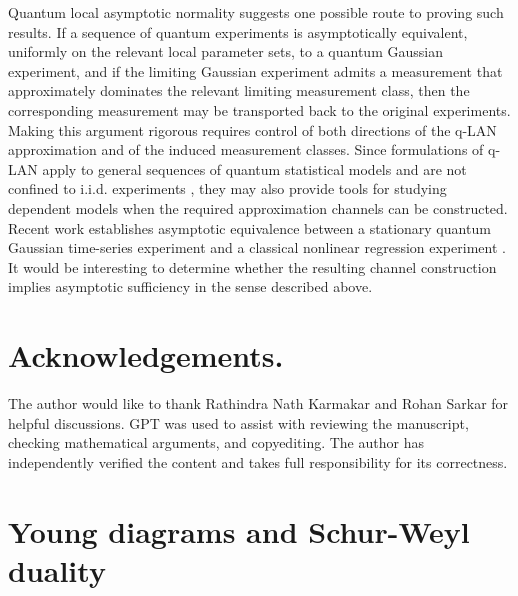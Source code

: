 \documentclass{article}
\theoremstyle{named}
\theoremstyle{named1}
\theoremstyle{plain}
\theoremstyle{remark}
\begin{document}
Quantum local asymptotic normality suggests one possible route to proving
such results. If a sequence of quantum experiments is asymptotically
equivalent, uniformly on the relevant local parameter sets, to a quantum
Gaussian experiment, and if the limiting Gaussian experiment admits a
measurement that approximately dominates the relevant limiting
measurement class, then the corresponding measurement may be transported
back to the original experiments. Making this argument rigorous requires
control of both directions of the q-LAN approximation and of the induced
measurement classes. Since formulations of q-LAN apply to general
sequences of quantum statistical models and are not confined to i.i.d.
experiments \cite{MR3320317}, they may also provide tools for studying
dependent models when the required approximation channels can be
constructed.
Recent work establishes asymptotic equivalence between a stationary quantum Gaussian time-series experiment and a classical nonlinear regression experiment \cite{nussbaum2025asymptotic}. It would be interesting to determine whether the resulting channel construction implies asymptotic sufficiency in the sense described above.


\section*{Acknowledgements.}

The author would like to thank Rathindra Nath Karmakar and Rohan Sarkar for helpful discussions. GPT was used to assist with reviewing the manuscript, checking mathematical arguments, and copyediting. The author has independently verified the content and takes full responsibility for its correctness.












\appendix

\section{Young diagrams and Schur-Weyl duality}
\end{document}
